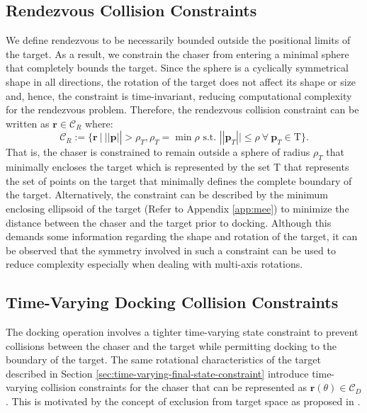 \subsection{Rendezvous Collision Constraints}
\label{sec:rendezvous-collision-constraints}
We define rendezvous to be necessarily bounded outside the positional limits of the target.
As a result, we constrain the chaser from entering a minimal sphere that completely bounds the target.
Since the sphere is a cyclically symmetrical shape in all directions, the rotation of the target does not affect its shape or size and, hence, the constraint is time-invariant, reducing computational complexity for the rendezvous problem.
Therefore, the rendezvous collision constraint can be written as $\boldsymbol{r}\in{\mathcal{C}}_R$ where:
\begin{equation}
    {\mathcal{C}}_R:=\{\boldsymbol{r}\ |\ ||\boldsymbol{p}||>\rho_T, \rho_T=\min\rho \text{ s.t. } ||\boldsymbol{p}_T||\leq\rho\ \forall\ \boldsymbol{p}_T\in\text{T}\}.
\end{equation}
That is, the chaser is constrained to remain outside a sphere of radius $\rho_T$ that minimally encloses the target which is represented by the set T that represents the set of points on the target that minimally defines the complete boundary of the target.
Alternatively, the constraint can be described by the minimum enclosing ellipsoid of the target (Refer to Appendix \ref{app:mee}) to minimize the distance between the chaser and the target prior to docking.
Although this demands some information regarding the shape and rotation of the target, it can be observed that the symmetry involved in such a constraint can be used to reduce complexity especially when dealing with multi-axis rotations.

\subsection{Time-Varying Docking Collision Constraints}
\label{sec:time-varying-collision-constraints}
The docking operation involves a tighter time-varying state constraint to prevent collisions between the chaser and the target while permitting docking to the boundary of the target.
The same rotational characteristics of the target described in Section \ref{sec:time-varying-final-state-constraint} introduce time-varying collision constraints for the chaser that can be represented as $\boldsymbol{r}(\theta)\in{\mathcal{C}}_D$.
This is motivated by the concept of exclusion from target space as proposed in \cite{park2017nonlinear}.

